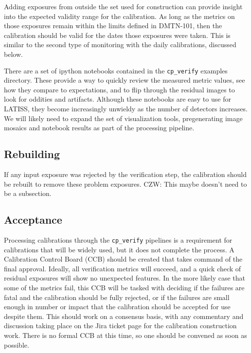 \documentclass[DM,authoryear,toc]{lsstdoc}
\begin{document}
Adding exposures from outside the set used for construction can provide insight into the expected validity range for the calibration.  As long as the metrics on those exposures remain within the limits defined in DMTN-101, then the calibration should be valid for the dates those exposures were taken.  This is similar to the second type of monitoring with the daily calibrations, discussed below.

There are a set of ipython notebooks contained in the \verb|cp_verify| examples directory.  These provide a way to quickly review the measured metric values, see how they compare to expectations, and to flip through the residual images to look for oddities and artifacts.  Although these notebooks are easy to use for LATISS, they become increasingly unwieldy as the number of detectors increases.  We will likely need to expand the set of visualization tools, pregenerating image mosaics and notebook results as part of the processing pipeline.

\subsection{Rebuilding}

If any input exposure was rejected by the verification step, the calibration should be rebuilt to remove these problem exposures.  CZW: This maybe doesn't need to be a subsection.

\subsection{Acceptance}

Processing calibrations through the \verb|cp_verify| pipelines is a requirement for calibrations that will be widely used, but it does not complete the process.  A Calibration Control Board (CCB) should be created that takes command of the final approval.  Ideally, all verification metrics will succeed, and a quick check of residual exposures will show no unexpected features.  In the more likely case that some of the metrics fail, this CCB will be tasked with deciding if the failures are fatal and the calibration should be fully rejected, or if the failures are small enough in number or impact that the calibration should be accepted for use despite them.  This should work on a consensus basis, with any commentary and discussion taking place on the Jira ticket page for the calibration construction work.  There is no formal CCB at this time, so one should be convened as soon as possible.
\end{document}
